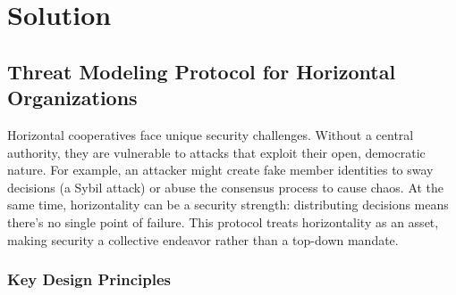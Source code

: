 
%

\chapter{Solution}
\label{cha:solution}

\glsresetall
 
\section{Threat Modeling Protocol for Horizontal Organizations}
\label{sec:protocol}

Horizontal cooperatives face unique security challenges. Without a central
authority, they are vulnerable to attacks that exploit their open, democratic
nature. For example, an attacker might create fake member identities to sway
decisions (a Sybil attack) or abuse the consensus process to cause chaos. At the
same time, horizontality can be a security strength: distributing decisions
means there's no single point of failure. This protocol treats horizontality
as an asset, making security a collective endeavor rather than a top-down
mandate.

\subsection{Key Design Principles}
\label{subsec:key_principles}


